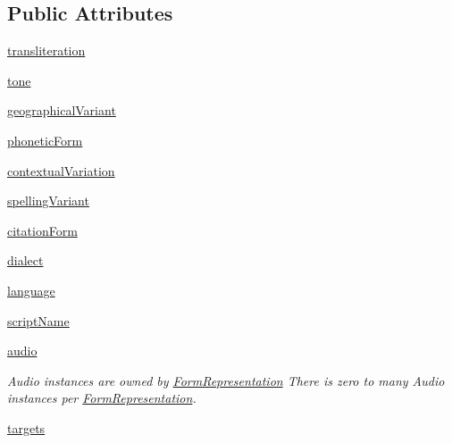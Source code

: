 \subsection*{Public Attributes}
\begin{DoxyCompactItemize}
\item 
\hyperlink{classlmf_1_1src_1_1core_1_1form__representation_1_1_form_representation_ab192387108c3c4e780297d1b409d5eff}{transliteration}
\item 
\hyperlink{classlmf_1_1src_1_1core_1_1form__representation_1_1_form_representation_a2cfea0271f8abfcffb74afb7641ef4df}{tone}
\item 
\hyperlink{classlmf_1_1src_1_1core_1_1form__representation_1_1_form_representation_a7d080181b73f2c03d3a2cf65a97be169}{geographical\+Variant}
\item 
\hyperlink{classlmf_1_1src_1_1core_1_1form__representation_1_1_form_representation_a50b914930f083c55e70e805a2430e88d}{phonetic\+Form}
\item 
\hyperlink{classlmf_1_1src_1_1core_1_1form__representation_1_1_form_representation_a1068952fddde59f78e8a56b785b0bcbf}{contextual\+Variation}
\item 
\hyperlink{classlmf_1_1src_1_1core_1_1form__representation_1_1_form_representation_aef2857854ecb2ca02c7ede104b617505}{spelling\+Variant}
\item 
\hyperlink{classlmf_1_1src_1_1core_1_1form__representation_1_1_form_representation_a70151ff258dea274006e4976818847a3}{citation\+Form}
\item 
\hyperlink{classlmf_1_1src_1_1core_1_1form__representation_1_1_form_representation_ad19ad7a519048bc71ff0d0df2c888621}{dialect}
\item 
\hyperlink{classlmf_1_1src_1_1core_1_1form__representation_1_1_form_representation_ad42d4a830850a55fd08ba3742abdde57}{language}
\item 
\hyperlink{classlmf_1_1src_1_1core_1_1form__representation_1_1_form_representation_a728fa20d7dcdbb6714f97b87cbe8ee0f}{script\+Name}
\item 
\hyperlink{classlmf_1_1src_1_1core_1_1form__representation_1_1_form_representation_ac13f0605619b9bdc6b921ae19b39c068}{audio}
\begin{DoxyCompactList}\small\item\em Audio instances are owned by \hyperlink{classlmf_1_1src_1_1core_1_1form__representation_1_1_form_representation}{Form\+Representation} There is zero to many Audio instances per \hyperlink{classlmf_1_1src_1_1core_1_1form__representation_1_1_form_representation}{Form\+Representation}. \end{DoxyCompactList}\item 
\hyperlink{classlmf_1_1src_1_1core_1_1form__representation_1_1_form_representation_a94e0845b7cf84cdbef5f1dceae0d7f99}{targets}
\end{DoxyCompactItemize}


